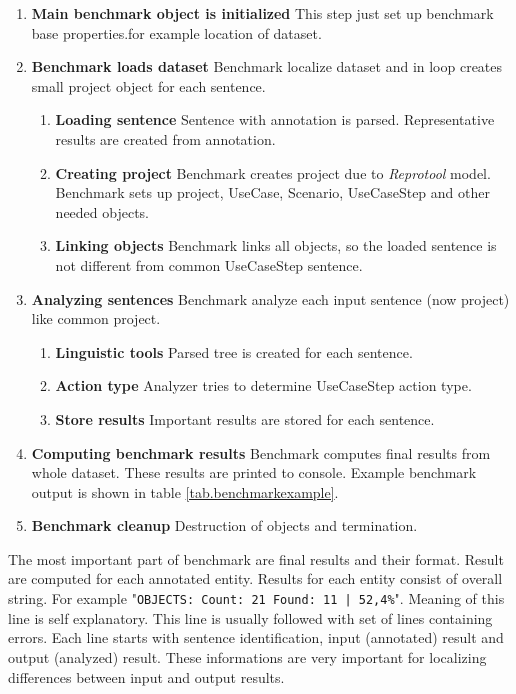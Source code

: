\begin{enumerate}
\item {\bf Main benchmark object is initialized} This step just set up benchmark base properties.for example location of dataset.

\item {\bf Benchmark loads dataset} Benchmark localize dataset and in loop creates small project object for each sentence.
    \begin{enumerate}
    \item {\bf Loading sentence} Sentence with annotation is parsed. Representative results are created from annotation.
    \item {\bf Creating project} Benchmark creates project due to \emph{Reprotool} model. Benchmark sets up project, UseCase, Scenario, UseCaseStep and other needed objects.
    \item {\bf Linking objects} Benchmark links all objects, so the loaded sentence is not different from common UseCaseStep sentence.
    \end{enumerate}

\item {\bf Analyzing sentences} Benchmark analyze each input sentence (now project)  like common project.
    \begin{enumerate}
    \item {\bf Linguistic tools} Parsed tree is created for each sentence.
    \item {\bf Action type} Analyzer tries to determine UseCaseStep action type.
    \item {\bf Store results} Important results are stored for each sentence.
    \end{enumerate}
\item {\bf Computing benchmark results} Benchmark computes final results from whole dataset. These results are printed to console. Example benchmark output is shown in table \ref{tab.benchmarkexample}.
\item {\bf Benchmark cleanup} Destruction of objects and termination.
\end{enumerate}

The most important part of benchmark are final results and their format. Result are computed for each annotated entity. Results for each entity consist of overall string. For example "{\tt OBJECTS: Count: 21 Found: 11 | 52,4\%}". Meaning of this line is self explanatory. This line is usually followed with set of lines containing errors. Each line starts with sentence identification, input (annotated) result and  output (analyzed) result. These informations are very important for localizing differences between input and output results.

